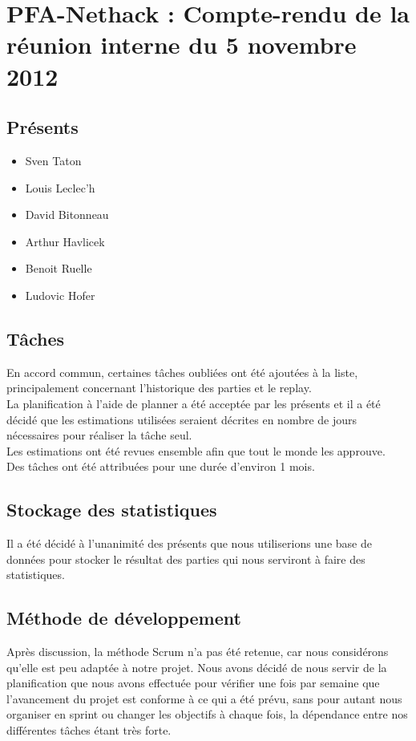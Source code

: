 \documentclass{article}
\newcommand {\ST}{Sven Taton}
\newcommand {\LL}{Louis Leclec'h}
\newcommand {\DB}{David Bitonneau}
\newcommand {\AH}{Arthur Havlicek}
\newcommand {\BR}{Benoit Ruelle}
\newcommand {\LH}{Ludovic Hofer}
\begin{document}
\section*{PFA-Nethack : Compte-rendu de la réunion interne du 5 novembre 2012}

\subsection*{Présents}
\begin{itemize}
\item \ST
\item \LL
\item \DB
\item \AH
\item \BR
\item \LH
\end{itemize}

\subsection*{Tâches}
En accord commun, certaines tâches oubliées ont été ajoutées à la liste, principalement concernant l'historique des parties et le replay.\\
La planification à l'aide de planner a été acceptée par les présents et il a été décidé que les estimations utilisées seraient décrites en nombre de jours nécessaires pour réaliser la tâche seul.\\
Les estimations ont été revues ensemble afin que tout le monde les approuve.\\
Des tâches ont été attribuées pour une durée d'environ 1 mois.

\subsection*{Stockage des statistiques}
Il a été décidé à l'unanimité des présents que nous utiliserions une base de données pour stocker le résultat des parties qui nous serviront à faire des statistiques.

\subsection*{Méthode de développement}
Après discussion, la méthode Scrum n'a pas été retenue, car nous considérons qu'elle est peu adaptée à notre projet. Nous avons décidé de nous servir de la planification que nous avons effectuée pour vérifier une fois par semaine que l'avancement du projet est conforme à ce qui a été prévu, sans pour autant nous organiser en sprint ou changer les objectifs à chaque fois, la dépendance entre nos différentes tâches étant très forte.
\end{document}
